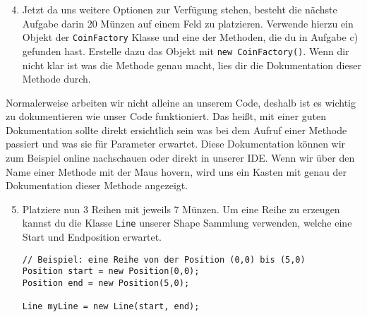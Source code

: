 \begin{enumerate} \setcounter{enumi}{3}
    \item Jetzt da uns weitere Optionen zur Verfügung stehen, besteht die nächste Aufgabe darin 20 Münzen auf einem Feld zu platzieren. Verwende hierzu ein Objekt der \texttt{CoinFactory} Klasse und eine der Methoden, die du in Aufgabe c) gefunden hast. Erstelle dazu das Objekt mit \texttt{new CoinFactory()}. Wenn dir nicht klar ist was die Methode genau macht, lies dir die Dokumentation dieser Methode durch.

\end{enumerate}

\begin{Infobox}
    Normalerweise arbeiten wir nicht alleine an unserem Code, deshalb ist es wichtig zu dokumentieren wie unser Code funktioniert. Das heißt, mit einer guten Dokumentation sollte direkt ersichtlich sein was bei dem Aufruf einer Methode passiert und was sie für Parameter erwartet. Diese Dokumentation können wir zum Beispiel online nachschauen oder direkt in unserer IDE. Wenn wir über den Name einer Methode mit der Maus hovern, wird uns ein Kasten mit genau der Dokumentation dieser Methode angezeigt.
\end{Infobox}


\begin{enumerate} \setcounter{enumi}{4}
    \item Platziere nun 3 Reihen mit jeweils 7 Münzen. Um eine Reihe zu erzeugen kannst du die Klasse \texttt{Line} unserer Shape Sammlung verwenden, welche eine Start und Endposition erwartet.

    \begin{lstlisting}
// Beispiel: eine Reihe von der Position (0,0) bis (5,0)
Position start = new Position(0,0);
Position end = new Position(5,0);

Line myLine = new Line(start, end);
    \end{lstlisting}

\end{enumerate}
